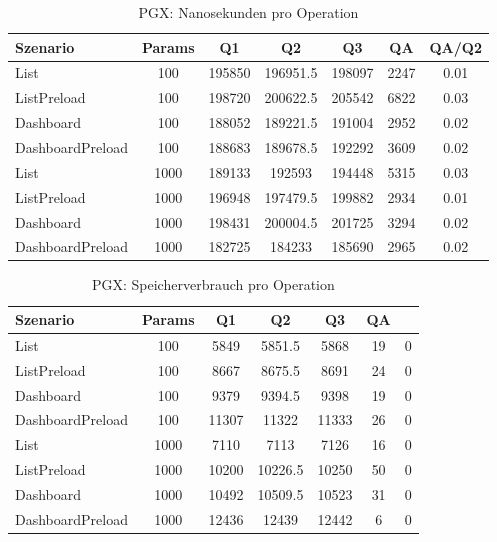 
\begin{table}[ht]
\centering
\caption{PGX: Nanosekunden pro Operation}
\begin{tabular}{lcccccc}
\toprule
Szenario & Params & Q1 & Q2 & Q3 & QA & QA/Q2 \\
\midrule
	List & 100 & 195850 & 196951.5 & 198097 & 2247 & 0.01 \\
	ListPreload & 100 & 198720 & 200622.5 & 205542 & 6822 & 0.03 \\
	Dashboard & 100 & 188052 & 189221.5 & 191004 & 2952 & 0.02 \\
	DashboardPreload & 100 & 188683 & 189678.5 & 192292 & 3609 & 0.02 \\
	List & 1000 & 189133 & 192593 & 194448 & 5315 & 0.03 \\
	ListPreload & 1000 & 196948 & 197479.5 & 199882 & 2934 & 0.01 \\
	Dashboard & 1000 & 198431 & 200004.5 & 201725 & 3294 & 0.02 \\
	DashboardPreload & 1000 & 182725 & 184233 & 185690 & 2965 & 0.02 \\
\bottomrule
\end{tabular}
\label{tab:benchmark_pgx_nsperop}
\end{table}
	
\begin{table}[ht]
\centering
\caption{PGX: Speicherverbrauch pro Operation}
\begin{tabular}{lccccc}
\toprule
Szenario & Params & Q1 & Q2 & Q3 & QA \\
\midrule
	List & 100 & 5849 & 5851.5 & 5868 & 19 & 0 \\
	ListPreload & 100 & 8667 & 8675.5 & 8691 & 24 & 0 \\
	Dashboard & 100 & 9379 & 9394.5 & 9398 & 19 & 0 \\
	DashboardPreload & 100 & 11307 & 11322 & 11333 & 26 & 0 \\
	List & 1000 & 7110 & 7113 & 7126 & 16 & 0 \\
	ListPreload & 1000 & 10200 & 10226.5 & 10250 & 50 & 0 \\
	Dashboard & 1000 & 10492 & 10509.5 & 10523 & 31 & 0 \\
	DashboardPreload & 1000 & 12436 & 12439 & 12442 & 6 & 0 \\
\bottomrule
\end{tabular}
\label{tab:benchmark_pgx_bytesperop}
\end{table}
	
